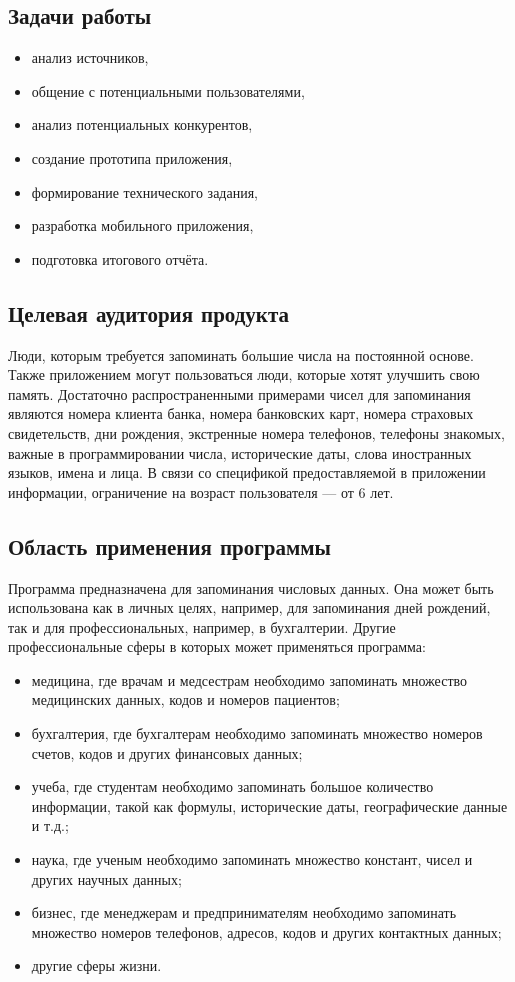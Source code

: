 \documentclass[draft]{article}
\begin{document}
\subsection{Задачи работы}
\begin{itemize}
\item анализ источников,
\item общение с потенциальными пользователями,
\item анализ потенциальных конкурентов,
\item создание прототипа приложения,
\item формирование технического задания,
\item разработка мобильного приложения,
\item подготовка итогового отчёта.
\end{itemize}
\subsection{Целевая аудитория продукта}
Люди, которым требуется запоминать большие числа на постоянной основе. Также приложением могут пользоваться люди, которые хотят улучшить свою память. Достаточно распространенными примерами чисел для запоминания являются номера клиента банка, номера банковских карт, номера страховых свидетельств, дни рождения, экстренные номера телефонов, телефоны знакомых, важные в программировании числа, исторические даты, слова иностранных языков, имена и лица. В связи со спецификой предоставляемой в приложении информации, ограничение на возраст пользователя — от 6 лет.
\subsection{Область применения программы}
Программа предназначена для запоминания числовых данных. Она может быть использована как в личных целях, например, для запоминания дней рождений, так и для профессиональных, например, в бухгалтерии. Другие профессиональные сферы в которых может применяться программа:
\begin{itemize}
\item медицина, где врачам и медсестрам необходимо запоминать множество медицинских данных, кодов и номеров пациентов;
\item бухгалтерия, где бухгалтерам необходимо запоминать множество номеров счетов, кодов и других финансовых данных;
\item учеба, где студентам необходимо запоминать большое количество информации, такой как формулы, исторические даты, географические данные и т.д.;
\item наука, где ученым необходимо запоминать множество констант, чисел и других научных данных;
\item бизнес, где менеджерам и предпринимателям необходимо запоминать множество номеров телефонов, адресов, кодов и других контактных данных;
\item другие сферы жизни.
\end{itemize}
\end{document}
